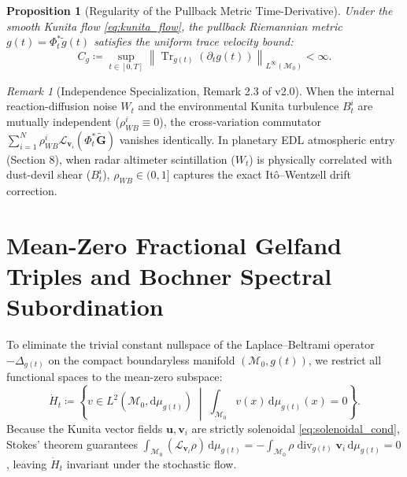 \documentclass[11pt,a4paper,reqno]{article}
\newtheorem{proposition}[theorem]{Proposition}
\theoremstyle{definition}
\theoremstyle{remark}
\newtheorem{remark}[theorem]{Remark}
\begin{document}
\begin{proposition}[Regularity of the Pullback Metric Time-Derivative]\label{prop:metric_trace_bound}
Under the smooth Kunita flow \eqref{eq:kunita_flow}, the pullback Riemannian metric $g(t) = \Phi_t^*\tilde{g}(t)$ satisfies the uniform trace velocity bound:
\begin{equation}\label{eq:metric_cg_bound}
  C_g \coloneqq \sup_{t \in [0,T]} \left\| \operatorname{Tr}_{g(t)}\!\left(\partial_t g(t)\right) \right\|_{L^\infty(\mathcal{M}_0)} < \infty.
\end{equation}
\end{proposition}

\begin{remark}[Independence Specialization, Remark 2.3 of v2.0]\label{rem:independence_spec}
When the internal reaction-diffusion noise $W_t$ and the environmental Kunita turbulence $B_t^i$ are mutually independent ($\rho_{WB}^i \equiv 0$), the cross-variation commutator $\sum_{i=1}^N \rho_{WB}^i \mathcal{L}_{\mathbf{v}_i}(\Phi_t^*\tilde{\mathbf{G}})$ vanishes identically. In planetary EDL atmospheric entry (Section 8), when radar altimeter scintillation ($W_t$) is physically correlated with dust-devil shear ($B_t^i$), $\rho_{WB} \in (0, 1]$ captures the exact It\^o--Wentzell drift correction.
\end{remark}

\section{Mean-Zero Fractional Gelfand Triples and Bochner Spectral Subordination}

To eliminate the trivial constant nullspace of the Laplace--Beltrami operator $-\Delta_{g(t)}$ on the compact boundaryless manifold $(\mathcal{M}_0, g(t))$, we restrict all functional spaces to the mean-zero subspace:
\begin{equation}\label{eq:mean_zero_hilbert}
  \dot{H}_t \coloneqq \left\{ v \in L^2(\mathcal{M}_0, \mathrm{d}\mu_{g(t)}) \;\middle|\; \int_{\mathcal{M}_0} v(x)\,\mathrm{d}\mu_{g(t)}(x) = 0 \right\}.
\end{equation}
Because the Kunita vector fields $\mathbf{u}, \mathbf{v}_i$ are strictly solenoidal \eqref{eq:solenoidal_cond}, Stokes' theorem guarantees $\int_{\mathcal{M}_0} (\mathcal{L}_{\mathbf{v}_i}\rho)\,\mathrm{d}\mu_{g(t)} = -\int_{\mathcal{M}_0} \rho \operatorname{div}_{g(t)}\mathbf{v}_i\,\mathrm{d}\mu_{g(t)} = 0$, leaving $\dot{H}_t$ invariant under the stochastic flow.
\end{document}
